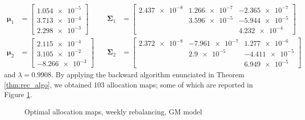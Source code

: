\begin{align}
\label{eq:GMparam1}
\bm{\mu}_1 & = 
\begin{bmatrix}
\num{1.054e-5} \\
\num{3.713e-4} \\
\num{2.298e-3}
\end{bmatrix}
\quad & \bm{\Sigma}_1 &= 
\begin{bmatrix}
\num{2.437e-8} & \num{1.266e-7} & \num{-2.365e-7} \\
& \num{3.596e-5}  & \num{-5.944e-5} \\
&                & \num{4.232e-4}
\end{bmatrix} \\
\bm{\mu}_2 & = \begin{bmatrix}
\num{2.115e-4} \\
\num{3.105e-2} \\
\num{-8.266e-3}
\end{bmatrix}
\quad & \bm{\Sigma}_2 &= 
\begin{bmatrix}
\num{2.372e-8} & \num{-7.961e-7} & \num{1.277e-6} \\
& \num{2.9e-5}  & \num{-4.411e-5} \\
&                & \num{6.949e-5}
\end{bmatrix}
\label{eq:GMparam2}
\end{align}
and $\lambda = 0.9908$.
By applying the backward algorithm enunciated in Theorem \ref{thm:rec_algo}, we obtained 103 allocation maps; some of which are reported in Figure \ref{fig:mapsMixture}.
\begin{figure}[]
	\caption{Optimal allocation maps, weekly rebalancing, GM model}
	\label{fig:mapsMixture}
\end{figure}


